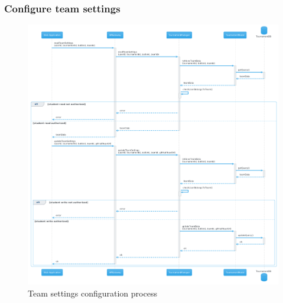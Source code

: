 \subsubsection{Configure team settings}
\begin{figure}[H]
    \hspace{-0.7cm}
    \includegraphics[width=1.1\textwidth]{Diagrams/sequence/configure_team_settings.png}
    \caption{Team settings configuration process}
\end{figure}

